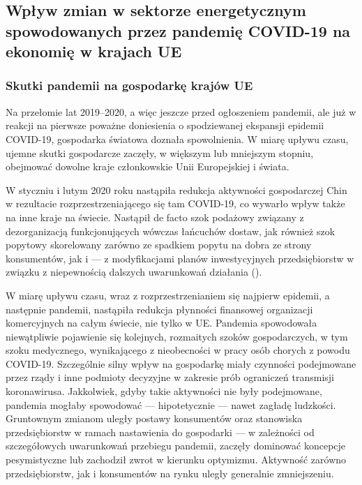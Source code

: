 \documentclass[polish, twoside, 12pt, a4paper]{article}
\theoremstyle{definition}
\theoremstyle{plain}
\theoremstyle{remark}
\begin{document}
\subsection{Wpływ zmian w sektorze energetycznym spowodowanych przez pandemię COVID-19 na ekonomię w krajach UE}

\subsubsection{Skutki pandemii na gospodarkę krajów UE}

Na przełomie lat 2019--2020, a więc jeszcze przed ogłoszeniem pandemii, ale już w reakcji na pierwsze poważne doniesienia o spodziewanej ekspansji epidemii COVID-19, gospodarka światowa doznała spowolnienia. W miarę upływu czasu, ujemne skutki gospodarcze zaczęły, w większym lub mniejszym stopniu, obejmować dowolne kraje członkowskie Unii Europejskiej i świata.  

W styczniu i lutym 2020 roku nastąpiła redukcja aktywności gospodarczej Chin w rezultacie rozprzestrzeniającego się tam COVID-19, co wywarło wpływ także na inne kraje na świecie. Nastąpił de facto szok podażowy związany z dezorganizacją funkcjonujących wówczas łańcuchów dostaw, jak również szok popytowy skorelowany zarówno ze spadkiem popytu na dobra ze strony konsumentów, jak i --- z modyfikacjami planów inwestycyjnych przedsiębiorstw w związku z niepewnością dalszych uwarunkowań działania (\cite{dziembala2021}). 

W miarę upływu czasu, wraz z rozprzestrzenianiem się najpierw epidemii, a następnie pandemii, nastąpiła redukcja płynności finansowej organizacji komercyjnych na całym świecie, nie tylko w UE. Pandemia spowodowała niewątpliwie pojawienie się kolejnych, rozmaitych szoków gospodarczych, w tym szoku medycznego, wynikającego z nieobecności w pracy osób chorych z powodu COVID-19. Szczególnie silny wpływ na gospodarkę miały czynności podejmowane przez rządy i inne podmioty decyzyjne w zakresie prób ograniczeń transmisji koronawirusa. Jakkolwiek, gdyby takie aktywności nie były podejmowane, pandemia mogłaby spowodować --- hipotetycznie --- nawet zagładę ludzkości. Gruntownym zmianom uległy postawy konsumentów oraz stanowiska przedsiębiorstw w ramach nastawienia do gospodarki --- w zależności od szczegółowych uwarunkowań przebiegu pandemii, zaczęły dominować koncepcje pesymistyczne lub zachodził zwrot w kierunku optymizmu. Aktywność zarówno przedsiębiorstw, jak i konsumentów na rynku uległy generalnie zmniejszeniu. 
\end{document}
